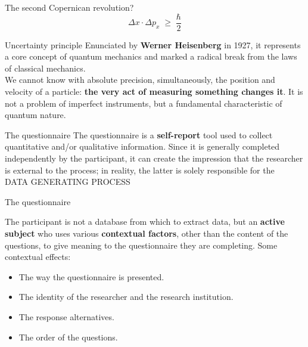 \documentclass{beamer}
\begin{document}
\begin{frame}{The second Copernican revolution?}
    \[
      \Delta x \cdot \Delta p_x \;\ge\; \frac{\hbar}{2}
    \]
\begin{block}{Uncertainty principle}
\small
    Enunciated by \textbf{Werner Heisenberg} in 1927, it represents a core concept of quantum mechanics and marked a radical break from the laws of classical mechanics. \\
    \smallskip
    We cannot know with absolute precision, simultaneously, the position and velocity of a particle: \textbf{the very act of measuring something changes it}. It is not a problem of imperfect instruments, but a fundamental characteristic of quantum nature.
\end{block}
\end{frame}

\begin{frame}{The questionnaire}
    The questionnaire is a \textbf{self-report} tool used to collect quantitative and/or qualitative information. Since it is generally completed independently by the participant, it can create the impression that the researcher is external to the process; in reality, the latter is solely responsible for the \\
    \vspace{1em}
    \pause
    \huge\centering
    \alert{DATA GENERATING PROCESS}
\end{frame}

\begin{frame}{The questionnaire}
\begin{block}{The participant}
    is not a database from which to extract data, but an \textbf{active subject} who uses various \textbf{contextual factors}, other than the content of the questions, to give meaning to the questionnaire they are completing. Some contextual effects: \\
    \begin{itemize}
        \item The way the questionnaire is presented.
        \item The identity of the researcher and the research institution.
        \item The response alternatives.
        \item The order of the questions.
    \end{itemize}
\end{block}
\end{frame}
\end{document}
